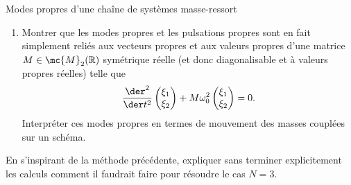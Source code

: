 \begin{exo}[PC][3][TD]{Modes propres d'une chaîne de systèmes masse-ressort}
\begin{quest}
\begin{enumerate}
{$$
\begin{cases}
  \dd{\xi_+}{t} & = -\frac{k}{m}\xi_+ \\
  \dd{\xi_-}{t} & = -\frac{3k}{m}\xi_- \\
\end{cases}
$$
On obtient deux modes propres:
$$
\begin{cases}
  \xi_+(t) & = A \cos(\omega_+ t) \\
  \xi_-(t) & = A \cos(\omega_- t)\\
\end{cases}
$$
avec $\omega_+ = \sqrt{\frac{k}{m}}$ et $\omega_- =  \sqrt{\frac{3k}{m}}$.
}
\item Montrer que les modes propres et les pulsations propres sont en fait simplement reliés aux vecteurs propres et aux valeurs propres d'une matrice $M\in\mc{M}_{2}(\mathbb{R})$ symétrique réelle (et donc diagonalisable et à valeurs propres réelles) telle que
\begin{align}
   \frac{\der^2}{\der t^2}\begin{pmatrix}
          \xi_1 \\
          \xi_2
        \end{pmatrix} + M\omega_0^2 \begin{pmatrix}
          \xi_1 \\
          \xi_2
        \end{pmatrix}=0.
        \end{align}
Interpréter ces modes propres en termes de mouvement des masses couplées sur un schéma.
\end{enumerate}
\item En s'inspirant de la méthode précédente, expliquer sans terminer explicitement les calculs comment il faudrait faire pour résoudre le cas $N=3$.
\end{quest}
\end{exo}

